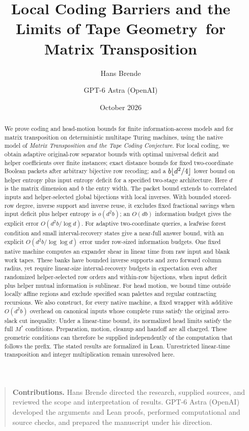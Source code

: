 \documentclass[11pt]{article}
\title{Local Coding Barriers and the Limits of Tape Geometry\ for Matrix Transposition}
\author{Hans Brende \and GPT-6 Astra (OpenAI)}
\date{October 2026}
\begin{document}
\maketitle
\begin{abstract}
We prove coding and head-motion bounds for finite information-access models and for matrix
transposition on deterministic multitape Turing machines, using the native
model of \emph{Matrix Transposition and the Tape Coding Conjecture}. For local
coding, we obtain adaptive original-row separator bounds with optimal universal
deficit and helper coefficients over finite instances; exact distance bounds
for fixed two-coordinate Boolean packets after arbitrary bijective row
recoding; and a
$b\lfloor d^2/4\rfloor$ lower bound on helper entropy plus input entropy deficit for a
specified two-stage architecture. Here $d$ is the matrix dimension and $b$ the
entry width. The packet bound extends to correlated inputs and helper-selected
global bijections with local inverses. With bounded stored-row degree, inverse
support and inverse reuse, it excludes fixed fractional savings when input
deficit plus helper entropy is $o(d^2b)$; an $O(db)$ information budget gives
the explicit error $O(d^2b/\log d)$. For adaptive two-coordinate queries, a
leafwise forest condition and small interval-recovery states give a near-full
answer bound, with an explicit $O(d^2b/\log\log d)$ error under row-sized
information budgets. One fixed native machine computes an expander shear in
linear time from raw input and blank work tapes. These banks have bounded
inverse supports and zero forward column radius, yet require linear-size
interval-recovery budgets in expectation even after randomized helper-selected
row orders and within-row bijections, when input deficit plus helper mutual
information is sublinear.
For head motion, we bound time outside
locally affine regions and exclude specified scan palettes and regular
contracting recursions.
We also construct, for every native machine, a fixed wrapper with additive
$O(d^2b)$ overhead on canonical inputs whose complete runs satisfy the original
zero-slack cut inequality. Under a linear-time bound, its normalized head limits
satisfy the full $M^*$ conditions. Preparation, motion, cleanup and handoff are
all charged. These geometric conditions can therefore be supplied independently
of the computation that follows the prefix. The stated results are formalized in
Lean. Unrestricted linear-time transposition and integer multiplication remain
unresolved here.
\end{abstract}
\begin{quote}\small
\textbf{Contributions.} Hans Brende directed the research, supplied sources,
and reviewed the scope and interpretation of results. GPT-6 Astra (OpenAI)
developed the arguments and Lean proofs, performed computational and source
checks, and prepared the manuscript under his direction.
\end{quote}
\tableofcontents
\clearpage








\appendix


\begingroup\small\raggedright


\endgroup
\end{document}
